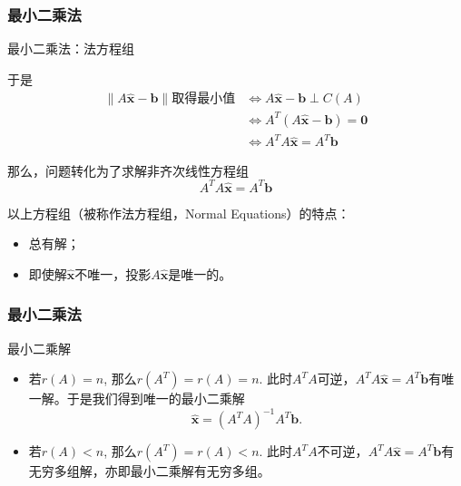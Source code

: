 
\begin{frame}
\frametitle{最小二乘法}

\begin{block}{最小二乘法：法方程组}

于是
\begin{align*}
\lVert A\widehat{\mathbf{x}} - \mathbf{b} \rVert \text{取得最小值} & \Longleftrightarrow A\widehat{\mathbf{x}} - \mathbf{b} \perp C(A) \\
& \Longleftrightarrow A^T (A\widehat{\mathbf{x}} - \mathbf{b}) = \mathbf{0} \\
& \Longleftrightarrow A^TA\widehat{\mathbf{x}} = A^T\mathbf{b}
\end{align*}

那么，问题转化为了求解非齐次线性方程组
\[A^TA\widehat{\mathbf{x}} = A^T\mathbf{b}\]

以上方程组（被称作法方程组，Normal Equations）的特点：
\begin{itemize}
\item 总有解；
\item 即使解$\widehat{\mathbf{x}}$不唯一，投影$A\widehat{\mathbf{x}}$是唯一的。
\end{itemize}
\end{block}

\end{frame}


\begin{frame}
\frametitle{最小二乘法}

\begin{block}{最小二乘解}
\begin{itemize}
\item<1-> 若$r(A) = n$, 那么$r(A^T) = r(A) = n$. 此时$A^TA$可逆，$A^TA\widehat{\mathbf{x}} = A^T\mathbf{b}$有唯一解。于是我们得到唯一的最小二乘解
\[\widehat{\mathbf{x}} = (A^TA)^{-1}A^T\mathbf{b}.\]
\item<2-> 若$r(A) < n$, 那么$r(A^T) = r(A) < n$. 此时$A^TA$不可逆，$A^TA\widehat{\mathbf{x}} = A^T\mathbf{b}$有无穷多组解，亦即最小二乘解有无穷多组。
\end{itemize}
\end{block}

\end{frame}


